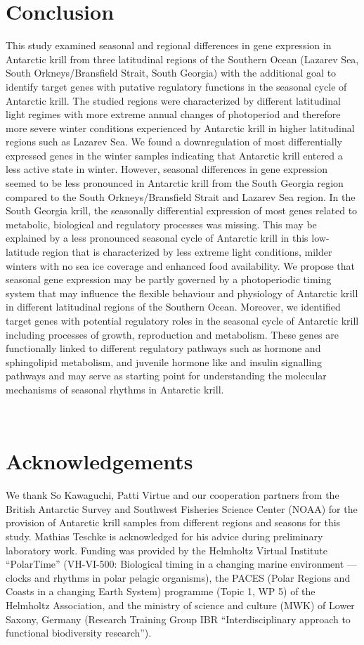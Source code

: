 \section{Conclusion}
This study examined seasonal and regional differences in gene expression in Antarctic krill from three latitudinal regions of the Southern Ocean (Lazarev Sea, South Orkneys/Bransfield Strait, South Georgia) with the additional goal to identify target genes with putative regulatory functions in the seasonal cycle of Antarctic krill. The studied regions were characterized by different latitudinal light regimes with more extreme annual changes of photoperiod and therefore more severe winter conditions experienced by Antarctic krill in higher latitudinal regions such as Lazarev Sea. We found a downregulation of most differentially expressed genes in the winter samples indicating that Antarctic krill entered a less active state in winter. However, seasonal differences in gene expression seemed to be less pronounced in Antarctic krill from the South Georgia region compared to the South Orkneys/Bransfield Strait and Lazarev Sea region. In the South Georgia krill, the seasonally differential expression of most genes related to metabolic, biological and regulatory processes was missing. This may be explained by a less pronounced seasonal cycle of Antarctic krill in this low-latitude region that is characterized by less extreme light conditions, milder winters with no sea ice coverage and enhanced food availability. We propose that seasonal gene expression may be partly governed by a photoperiodic timing system that may influence the flexible behaviour and physiology of Antarctic krill in different latitudinal regions of the Southern Ocean. Moreover, we identified target genes with potential regulatory roles in the seasonal cycle of Antarctic krill including processes of growth, reproduction and metabolism. These genes are functionally linked to different regulatory pathways such as hormone and sphingolipid metabolism, and juvenile hormone like and insulin signalling pathways and may serve as starting point for understanding the molecular mechanisms of seasonal rhythms in Antarctic krill.


 
\section{Acknowledgements}
We thank So Kawaguchi, Patti Virtue and our cooperation partners from the British Antarctic Survey and Southwest Fisheries Science Center (NOAA) for the provision of Antarctic krill samples from different regions and seasons for this study. Mathias Teschke is acknowledged for his advice during preliminary laboratory work.
Funding was provided by the Helmholtz Virtual Institute “PolarTime” (VH-VI-500: Biological timing in a changing marine environment — clocks and rhythms in polar pelagic organisms), the PACES (Polar Regions and Coasts in a changing Earth System) programme (Topic 1, WP 5) of the Helmholtz Association, and the ministry of science and culture (MWK) of Lower Saxony, Germany (Research Training Group IBR “Interdisciplinary approach to functional biodiversity research”). 

